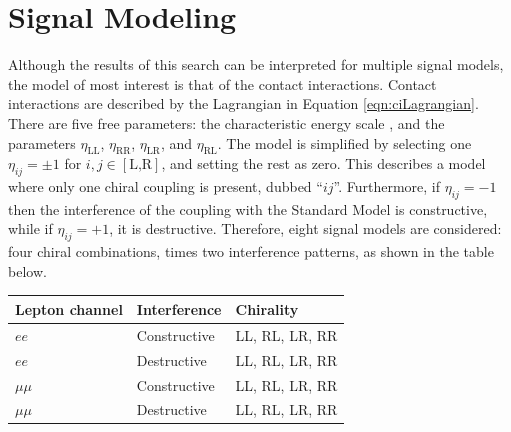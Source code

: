\section{Signal Modeling}\label{sec:ciSig}

Although the results of this search can be interpreted for multiple signal models, the model of most interest is that of the \llqq contact interactions.
Contact interactions are described by the Lagrangian in Equation \ref{eqn:ciLagrangian}.
There are five free parameters: the characteristic energy scale \lam, and the parameters $\eta_\text{LL}$, $\eta_\text{RR}$, $\eta_\text{LR}$, and $\eta_\text{RL}$.
The model is simplified by selecting one $\eta_{ij}=\pm1$ for $i,j\in[\text{L,R}]$, and setting the rest as zero.
This describes a model where only one chiral coupling is present, dubbed ``$ij$''.
Furthermore, if $\eta_{ij}=-1$ then the interference of the coupling with the Standard Model is constructive, while if $\eta_{ij}=+1$, it is destructive.
Therefore, eight signal models are considered: four chiral combinations, times two interference patterns, as shown in the table below.
\begin{center}
\begin{tabular}{l l l}
  \toprule
  Lepton channel & Interference & Chirality \\
  \midrule
  $ee$ & Constructive & LL, RL, LR, RR \\
  $ee$ & Destructive & LL, RL, LR, RR \\
  $\mu\mu$ & Constructive & LL, RL, LR, RR \\
  $\mu\mu$ & Destructive & LL, RL, LR, RR \\
  \bottomrule
\end{tabular}
\end{center}


